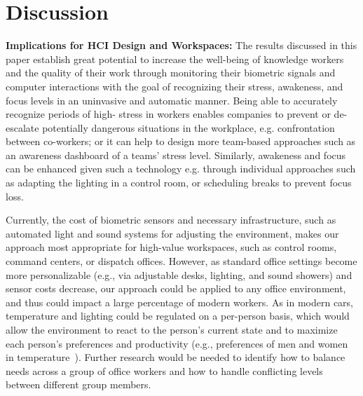 \section{Discussion}
\noindent
\textbf{Implications for HCI Design and Workspaces:}
The results discussed in this paper establish great potential
to increase the well-being of knowledge workers and the quality of their work
through monitoring their biometric signals and computer interactions with the
goal of recognizing their stress, awakeness, and focus levels in an uninvasive 
and automatic manner. Being able to accurately recognize periods of high-
stress in workers enables companies to prevent or de-escalate potentially 
dangerous situations in the workplace, e.g. confrontation between co-workers; 
or it can help to design more team-based approaches such as an 
awareness dashboard of a teams’ stress level.
Similarly, awakeness and focus
can be enhanced given such a technology
e.g. through individual approaches such as adapting the lighting in a control 
room, or scheduling breaks to prevent focus loss.

Currently, the cost of biometric sensors and necessary infrastructure, such as automated light and sound systems for adjusting the environment, makes our approach most appropriate for high-value workspaces, such as control rooms, command centers, or dispatch offices. However, as standard office settings become more personalizable (e.g., via adjustable desks, lighting, and sound showers) and sensor costs decrease, our approach could be applied to any office environment, and thus could impact a large percentage of modern workers. As in modern cars, temperature and lighting could be regulated on a per-person basis, which would allow the environment to react to the person's current state and to maximize each person's preferences and productivity (e.g., preferences of men and women in temperature~\cite{Karjalainen07}). Further research would be needed to identify how to balance needs across a group of office workers and how to handle conflicting levels between different group members.

